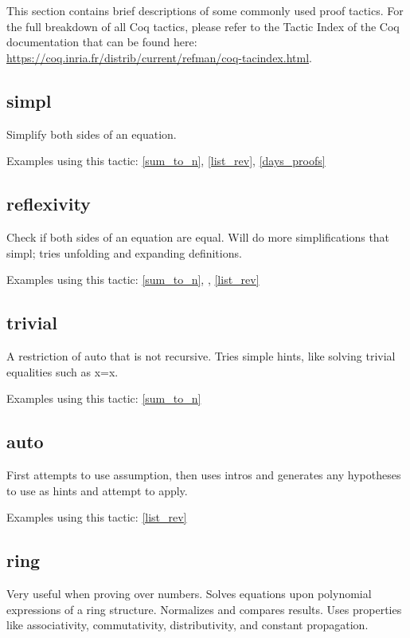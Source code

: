 
This section contains brief descriptions of some commonly used proof tactics.
For the full breakdown of all Coq tactics, please refer to the Tactic Index of the Coq documentation that can be found here:
\url{https://coq.inria.fr/distrib/current/refman/coq-tacindex.html}.


\subsection{simpl} \label{simpl}
Simplify both sides of an equation.

\noindent
Examples using this tactic: 
\ref{sum_to_n}, \ref{list_rev}, \ref{days_proofs}




\subsection{reflexivity} \label{reflexivity}
Check if both sides of an equation are equal. 
Will do more simplifications that simpl; tries unfolding and expanding definitions.

\noindent
Examples using this tactic: 
\ref{sum_to_n}, , \ref{list_rev}




\subsection{trivial} \label{trivial}
A restriction of auto that is not recursive. 
Tries simple hints, like solving trivial equalities such as x=x.

\noindent
Examples using this tactic: 
\ref{sum_to_n}



\subsection{auto} \label{auto}
First attempts to use assumption, then uses intros and generates any hypotheses to use as hints and attempt to apply.

\noindent
Examples using this tactic: 
\ref{list_rev}


\subsection{ring} \label{ring}
Very useful when proving over numbers.
Solves equations upon polynomial expressions of a ring structure. 
Normalizes and compares results.
Uses properties like associativity, commutativity, distributivity, and constant propagation.

